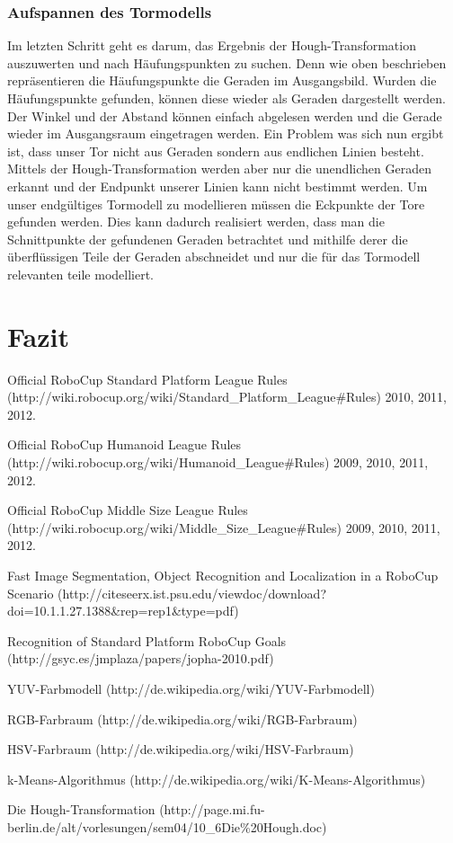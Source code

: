 \documentclass[a4paper,12pt]{article}
\begin{document}
\subsubsection{Aufspannen des Tormodells}
Im letzten Schritt geht es darum, das Ergebnis der Hough-Transformation auszuwerten und nach Häufungspunkten zu suchen. Denn wie oben beschrieben repräsentieren die Häufungspunkte die Geraden im Ausgangsbild. Wurden die Häufungspunkte gefunden, können diese wieder als Geraden dargestellt werden. Der Winkel und der Abstand können einfach abgelesen werden und die Gerade wieder im Ausgangsraum eingetragen werden. Ein Problem was sich nun ergibt ist, dass unser Tor nicht aus Geraden sondern aus endlichen Linien besteht. Mittels der Hough-Transformation werden aber nur die unendlichen Geraden erkannt und der Endpunkt unserer Linien kann nicht bestimmt werden. Um unser endgültiges Tormodell zu modellieren müssen die Eckpunkte der Tore gefunden werden. Dies kann dadurch realisiert werden, dass man die Schnittpunkte der gefundenen Geraden betrachtet und mithilfe derer die überflüssigen Teile der Geraden abschneidet und nur die für das Tormodell relevanten teile modelliert.


\section{Fazit}

\newpage

\begin{thebibliography}{9}

  Official RoboCup Standard Platform League Rules (http://wiki.robocup.org/wiki/Standard\_Platform\_League\#Rules)
  2010, 2011, 2012.

  Official RoboCup Humanoid League Rules (http://wiki.robocup.org/wiki/Humanoid\_League\#Rules)
  2009, 2010, 2011, 2012.  

  Official RoboCup Middle Size League Rules (http://wiki.robocup.org/wiki/Middle\_Size\_League\#Rules)
  2009, 2010, 2011, 2012.

  Fast Image Segmentation, Object Recognition and Localization in a RoboCup Scenario (http://citeseerx.ist.psu.edu/viewdoc/download?doi=10.1.1.27.1388\&rep=rep1\&type=pdf)

  Recognition of Standard Platform RoboCup Goals (http://gsyc.es/jmplaza/papers/jopha-2010.pdf)

  YUV-Farbmodell (http://de.wikipedia.org/wiki/YUV-Farbmodell)

  RGB-Farbraum (http://de.wikipedia.org/wiki/RGB-Farbraum)

  HSV-Farbraum (http://de.wikipedia.org/wiki/HSV-Farbraum)

  k-Means-Algorithmus (http://de.wikipedia.org/wiki/K-Means-Algorithmus)
  
  Die Hough-Transformation (http://page.mi.fu-berlin.de/alt/vorlesungen/sem04/10\_6Die\%20Hough.doc)

  
\end{thebibliography}
\end{document}
